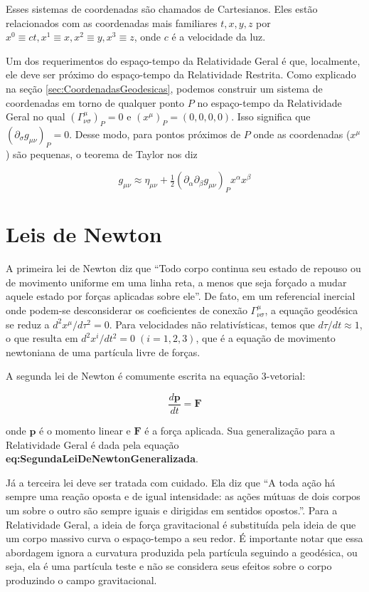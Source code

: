 Esses sistemas de coordenadas são chamados de Cartesianos. Eles estão relacionados com as coordenadas mais familiares $ t, x, y, z $ por $ x^0 \equiv ct, x^1\equiv x, x^2\equiv y, x^3 \equiv z $, onde $ c $ é a velocidade da luz.

Um dos requerimentos do espaço-tempo da Relatividade Geral é que, localmente, ele deve ser próximo do espaço-tempo da Relatividade Restrita. {\color{red} Como explicado na seção \ref{sec:CoordenadasGeodesicas}}, podemos construir um sistema de coordenadas em torno de qualquer ponto $ P $ no espaço-tempo da Relatividade Geral no qual $ \left(\Gamma_{\nu \sigma}^{\mu}\right)_{P}=0 $ e $ \left(x^{\mu}\right)_{P}=(0,0,0,0) $. Isso significa que $ \left(\partial_{\sigma} g_{\mu \nu}\right)_{P}=0 $. Desse modo, para pontos próximos de $ P $ onde as coordenadas ($ x^\mu $) são pequenas, o teorema de Taylor nos diz

\begin{equation}\label{eq:TensorMetricaAproximado}
g_{\mu \nu} \approx \eta_{\mu \nu}+\tfrac{1}{2}\left(\partial_{\alpha} \partial_{\beta} g_{\mu \nu}\right)_{P} x^{\alpha} x^{\beta}
\end{equation}



\section{Leis de Newton}\label{sec:LeisDeNewton}

A primeira lei de Newton diz que ``Todo corpo continua seu estado de repouso ou de movimento uniforme em uma linha reta, a menos que seja forçado a mudar aquele estado por forças aplicadas sobre ele''. De fato, em um referencial inercial onde podem-se desconsiderar os coeficientes de conexão $ \Gamma^{\mu}_{\nu\sigma} $, a equação geodésica se reduz a $ d^{2} x^{\mu} / d \tau^{2}=0 $. Para velocidades não relativísticas, temos que $ d\tau/dt \approx 1$, o que resulta em $ d^{2} x^{i} / d t^{2}=0\;(i=1,2,3) $, que é a equação de movimento newtoniana de uma partícula livre de forças.

A segunda lei de Newton é comumente escrita na equação 3-vetorial:

\[\dfrac{d\mathbf{p}}{dt}=\mathbf{F}\]

onde $ \mathbf{p} $ é o momento linear e $ \mathbf{F} $ é a força aplicada. Sua generalização para a Relatividade Geral é dada pela equação \textbf{eq:SegundaLeiDeNewtonGeneralizada}.

Já a terceira lei deve ser tratada com cuidado. Ela diz que ``A toda ação há sempre uma reação oposta e de igual intensidade: as ações mútuas de dois corpos um sobre o outro são sempre iguais e dirigidas em sentidos opostos.''. Para a Relatividade Geral, a ideia de força gravitacional é substituída pela ideia de que um corpo massivo curva o espaço-tempo a seu redor. É importante notar que essa abordagem ignora a curvatura produzida pela partícula seguindo a geodésica, ou seja, ela é uma partícula teste e não se considera seus efeitos sobre o corpo produzindo o campo gravitacional.


